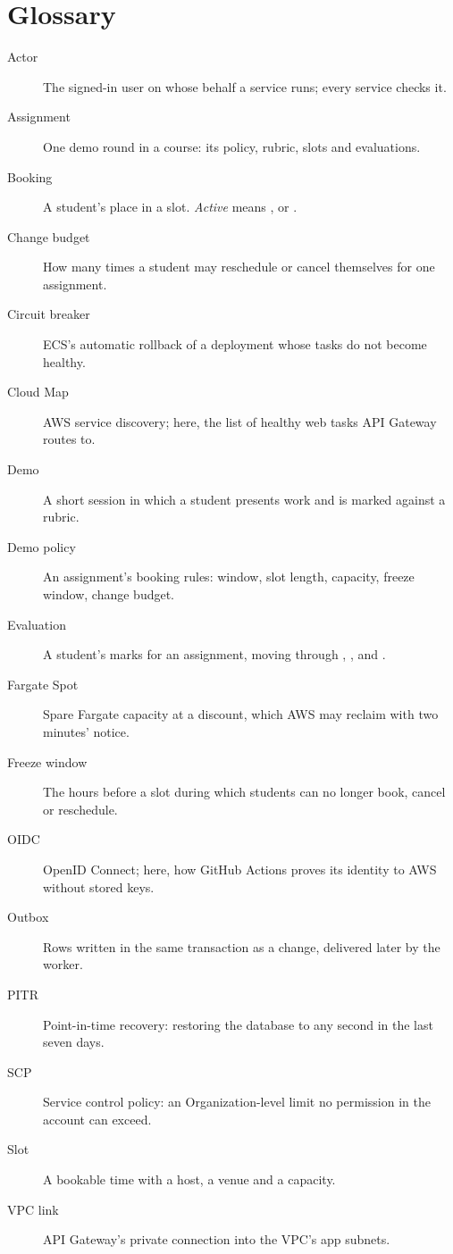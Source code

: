 \chapter{Glossary}\label{app:glossary}

\begin{description}
  \item[Actor] The signed-in user on whose behalf a service runs; every service checks it.
  \item[Assignment] One demo round in a course: its policy, rubric, slots and evaluations.
  \item[Booking] A student's place in a slot. \emph{Active} means ,  or .
  \item[Change budget] How many times a student may reschedule or cancel themselves for one assignment.
  \item[Circuit breaker] ECS's automatic rollback of a deployment whose tasks do not become healthy.
  \item[Cloud Map] AWS service discovery; here, the list of healthy web tasks API Gateway routes to.
  \item[Demo] A short session in which a student presents work and is marked against a rubric.
  \item[Demo policy] An assignment's booking rules: window, slot length, capacity, freeze window, change budget.
  \item[Evaluation] A student's marks for an assignment, moving through , ,  and .
  \item[Fargate Spot] Spare Fargate capacity at a discount, which AWS may reclaim with two minutes' notice.
  \item[Freeze window] The hours before a slot during which students can no longer book, cancel or reschedule.
  \item[OIDC] OpenID Connect; here, how GitHub Actions proves its identity to AWS without stored keys.
  \item[Outbox] Rows written in the same transaction as a change, delivered later by the worker.
  \item[PITR] Point-in-time recovery: restoring the database to any second in the last seven days.
  \item[SCP] Service control policy: an Organization-level limit no permission in the account can exceed.
  \item[Slot] A bookable time with a host, a venue and a capacity.
  \item[VPC link] API Gateway's private connection into the VPC's app subnets.
\end{description}
